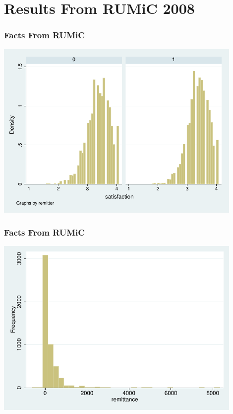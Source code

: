 \documentclass[10pt]{beamer}
\begin{document}
\section{Results From RUMiC 2008}
\begin{frame}[c]\frametitle{Facts From RUMiC}
\begin{center}
\includegraphics[width=0.9\textwidth]{satisfaction_rumic.pdf}
\end{center}
\end{frame}

\begin{frame}[c]\frametitle{Facts From RUMiC}
\begin{center}
\includegraphics[width=0.9\textwidth]{remittance_rumic.pdf}
\end{center}

\end{frame}
\end{document}
